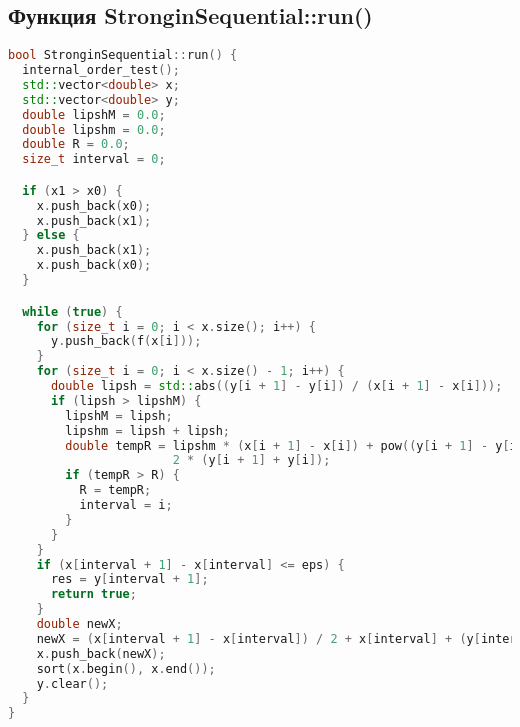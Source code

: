 \documentclass[a4paper,12pt]{article}
\begin{document}
\subsection*{Функция StronginSequential::run()}
\begin{lstlisting}[language=C++]
bool StronginSequential::run() {
  internal_order_test();
  std::vector<double> x;
  std::vector<double> y;
  double lipshM = 0.0;
  double lipshm = 0.0;
  double R = 0.0;
  size_t interval = 0;

  if (x1 > x0) {
    x.push_back(x0);
    x.push_back(x1);
  } else {
    x.push_back(x1);
    x.push_back(x0);
  }

  while (true) {
    for (size_t i = 0; i < x.size(); i++) {
      y.push_back(f(x[i]));
    }
    for (size_t i = 0; i < x.size() - 1; i++) {
      double lipsh = std::abs((y[i + 1] - y[i]) / (x[i + 1] - x[i]));
      if (lipsh > lipshM) {
        lipshM = lipsh;
        lipshm = lipsh + lipsh;
        double tempR = lipshm * (x[i + 1] - x[i]) + pow((y[i + 1] - y[i]), 2) / (lipshm * (x[i + 1] - x[i])) -
                       2 * (y[i + 1] + y[i]);
        if (tempR > R) {
          R = tempR;
          interval = i;
        }
      }
    }
    if (x[interval + 1] - x[interval] <= eps) {
      res = y[interval + 1];
      return true;
    }
    double newX;
    newX = (x[interval + 1] - x[interval]) / 2 + x[interval] + (y[interval + 1] - y[interval]) / (2 * lipshm);
    x.push_back(newX);
    sort(x.begin(), x.end());
    y.clear();
  }
}
\end{lstlisting}
\end{document}
